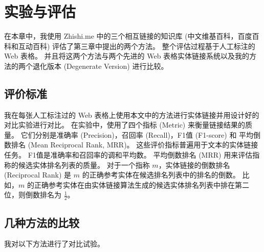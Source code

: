 \chapter{实验与评估}
在本章中，我使用 Zhishi.me 中的三个相互链接的知识库 (中文维基百科，百度百科和互动百科) 评估了第三章中提出的两个方法。
整个评估过程基于人工标注的 Web 表格。
并且将这两个方法与两个先进的 Web 表格实体链接系统以及我的方法的两个退化版本 (Degenerate Version) 进行比较。

\section{评价标准}
我在每张人工标注过的 Web 表格上使用本文中的方法进行实体链接并用设计好的对比实验进行对比。
在实验中，使用了四个指标 (Metric) 来衡量链接结果的质量。
它们分别是准确率 (Precision)，召回率 (Recall)，F1值 (F1-score) 和 平均倒数排名 (Mean Reciprocal Rank\cite{craswell2009mean}, MRR)。
这些评价指标普遍用于文本的实体链接任务\cite{bhagavatula2015tabel}。
F1值是准确率和召回率的调和平均数。
平均倒数排名 (MRR) 用来评估指称的候选实体排名列表的质量。
对于一个指称 $m$，实体链接的倒数排名 (Reciprocal Rank) 是 $m$ 的正确参考实体在候选排名列表中的排名的倒数。
比如，$m$ 的正确参考实体在由实体链接算法生成的候选实体排名列表中排在第二位，则倒数排名为 $\frac{1}{2}$。


\section{几种方法的比较}
我对以下方法进行了对比试验。

